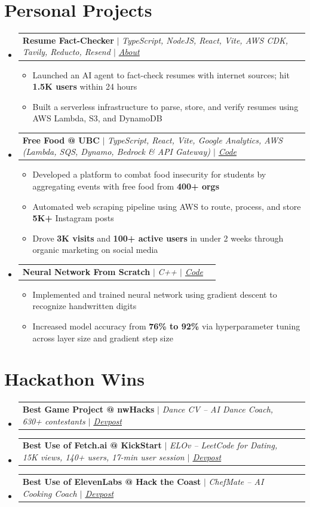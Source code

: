 \documentclass[letterpaper,11pt]{article}
\makeatletter
\newcommand{\resumeItem}[1]{
  \item\small{
    {#1 \vspace{-0.6pt}}
  }
}
\newcommand{\resumeProjectHeading}[2]{
    \item
    \begin{tabular*}{0.97\textwidth}{l@{\extracolsep{\fill}}r}
      \small#1 & #2 \\
    \end{tabular*}\vspace{-7pt}
}
\newcommand{\resumeSubHeadingListStart}{\begin{itemize}[leftmargin=0.15in, label={}]}
\newcommand{\resumeSubHeadingListEnd}{\end{itemize}}
\newcommand{\resumeItemListStart}{\begin{itemize}}
\newcommand{\resumeItemListEnd}{\end{itemize}\vspace{-7pt}}
\makeatother
\begin{document}
\section{Personal Projects}
  \resumeSubHeadingListStart
        \resumeProjectHeading
          {\textbf{Resume Fact-Checker} $|$ \emph{TypeScript, NodeJS, React, Vite, AWS CDK, Tavily, Reducto, Resend $|$ \href{https://www.linkedin.com/feed/update/urn:li:activity:7424145830577729536/}{{\underline{About}}}}}{}
      \resumeItemListStart
        \resumeItem{Launched an AI agent to fact-check resumes with internet sources; hit \textbf{1.5K users} within 24 hours}
        \resumeItem{Built a serverless infrastructure to parse, store, and verify resumes using AWS Lambda, S3, and DynamoDB}
      \resumeItemListEnd
        \resumeProjectHeading
          {\textbf{Free Food @ UBC} $|$ \emph{TypeScript, React, Vite, Google Analytics, AWS (Lambda, SQS, Dynamo, Bedrock \& API Gateway) $|$ \href{https://github.com/douglasichen/ubceventscdk}{{\underline{Code}}}}}{}
      \resumeItemListStart
        \resumeItem{Developed a platform to combat food insecurity for students by aggregating events with free food from \textbf{400+ orgs}}
        \resumeItem{Automated web scraping pipeline using AWS to route, process, and store \textbf{5K+} Instagram posts}
        \resumeItem{Drove \textbf{3K visits} and \textbf{100+ active users} in under 2 weeks through organic marketing on social media}
      \resumeItemListEnd
        \resumeProjectHeading
          {\textbf{Neural Network From Scratch} $|$ \emph{C++ $|$ \href{https://github.com/douglasichen/Neural-Network-From-Scratch}{{\underline{Code}}}}}{}
      \resumeItemListStart
        \resumeItem{Implemented and trained neural network using gradient descent to recognize handwritten digits}
        \resumeItem{Increased model accuracy from \textbf{76\% to 92\%} via hyperparameter tuning across layer size and gradient step size}
      \resumeItemListEnd
  \resumeSubHeadingListEnd

\section{Hackathon Wins}
  \resumeSubHeadingListStart
        \resumeProjectHeading
          {\textbf{Best Game Project @ nwHacks} $|$ \emph{Dance CV -- AI Dance Coach, 630+ contestants $|$ \href{https://devpost.com/software/dance-cv}{{\underline{Devpost}}}}}{}
        \resumeProjectHeading
          {\textbf{Best Use of Fetch.ai @ KickStart} $|$ \emph{ELOv -- LeetCode for Dating, 15K views, 140+ users, 17-min user session $|$ \href{https://devpost.com/software/elov}{{\underline{Devpost}}}}}{}
        \resumeProjectHeading
          {\textbf{Best Use of ElevenLabs @ Hack the Coast} $|$ \emph{ChefMate -- AI Cooking Coach $|$ \href{https://devpost.com/software/chefmate-j0mh5d}{{\underline{Devpost}}}}}{}
      \vspace{-8pt}
  \resumeSubHeadingListEnd
\end{document}
